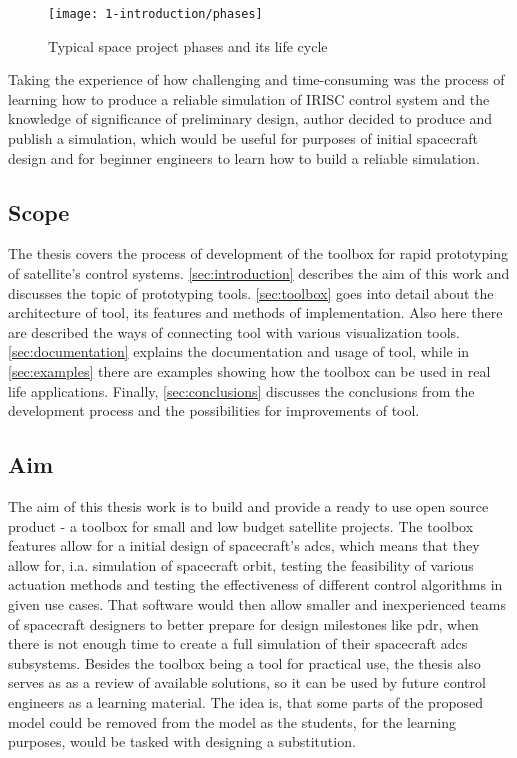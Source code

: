     \begin{figure}[H]
        \centering
        \texttt{[image: 1-introduction/phases]}
        \caption{Typical space project phases and its life cycle\cite{nguyen2000effective}}
        \label{fig:phases}
    \end{figure}

    Taking the experience of how challenging and time-consuming was the process of learning how to produce a reliable simulation of IRISC control system and the knowledge of significance of preliminary design, author decided to produce and publish a simulation, which would be useful for purposes of initial spacecraft design and for beginner engineers to learn how to build a reliable simulation. 
    

\subsection{Scope}
    The thesis covers the process of development of the toolbox for rapid prototyping of satellite's control systems. \autoref{sec:introduction} describes the aim of this work and discusses the topic of prototyping tools. \autoref{sec:toolbox} goes into detail about the architecture of \ac{tool}, its features and methods of implementation. Also here there are described the ways of connecting \ac{tool} with various visualization tools. \autoref{sec:documentation} explains the documentation and usage of \ac{tool}, while in \autoref{sec:examples} there are examples showing how the toolbox can be used in real life applications. Finally, \autoref{sec:conclusions} discusses the conclusions from the development process and the possibilities for improvements of \ac{tool}.

\subsection{Aim}\label{sec:aim}
    The aim of this thesis work is to build and provide a ready to use open source product - a toolbox for small and low budget satellite projects.  The toolbox features allow for a initial design of spacecraft's \ac{adcs}, which means that they allow for, i.a. simulation of spacecraft orbit, testing the feasibility of various actuation methods and testing the effectiveness of different control algorithms in given use cases. That software would then allow smaller and inexperienced teams of spacecraft designers to better prepare for design milestones like \ac{pdr}, when there is not enough time to create a full simulation of their spacecraft \ac{adcs} subsystems. Besides the toolbox being a tool for practical use, the thesis also serves as as a review of available solutions, so it can be used by future control engineers as a learning material. The idea is, that some parts of the proposed model could be removed from the model as the students, for the learning purposes, would be tasked with designing a substitution.

